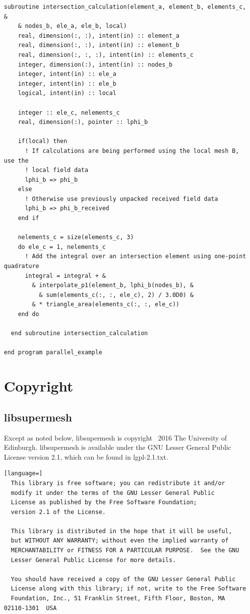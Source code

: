\documentclass{article}
\begin{document}
\begin{lstlisting}[language=FORTRAN]
  subroutine intersection_calculation(element_a, element_b, elements_c, &
    & nodes_b, ele_a, ele_b, local)
    real, dimension(:, :), intent(in) :: element_a
    real, dimension(:, :), intent(in) :: element_b
    real, dimension(:, :, :), intent(in) :: elements_c
    integer, dimension(:), intent(in) :: nodes_b
    integer, intent(in) :: ele_a
    integer, intent(in) :: ele_b
    logical, intent(in) :: local

    integer :: ele_c, nelements_c
    real, dimension(:), pointer :: lphi_b
    
    if(local) then
      ! If calculations are being performed using the local mesh B, use the
      ! local field data
      lphi_b => phi_b
    else
      ! Otherwise use previously unpacked received field data
      lphi_b => phi_b_received
    end if

    nelements_c = size(elements_c, 3)
    do ele_c = 1, nelements_c
      ! Add the integral over an intersection element using one-point quadrature
      integral = integral + &
        & interpolate_p1(element_b, lphi_b(nodes_b), &
          & sum(elements_c(:, :, ele_c), 2) / 3.0D0) &
        & * triangle_area(elements_c(:, :, ele_c))
    end do    
    
  end subroutine intersection_calculation
  
end program parallel_example
\end{lstlisting}

\section{Copyright}\label{sect:copyright}

\subsection{libsupermesh}

Except as noted below, libsupermesh is copyright \textcopyright\ 2016 The
University of Edinburgh. libsupermesh is available under the GNU Lesser General
Public License version 2.1, which can be found in lgpl-2.1.txt.

\begin{lstlisting}[language=]
  This library is free software; you can redistribute it and/or
  modify it under the terms of the GNU Lesser General Public
  License as published by the Free Software Foundation;
  version 2.1 of the License.

  This library is distributed in the hope that it will be useful,
  but WITHOUT ANY WARRANTY; without even the implied warranty of
  MERCHANTABILITY or FITNESS FOR A PARTICULAR PURPOSE.  See the GNU
  Lesser General Public License for more details.

  You should have received a copy of the GNU Lesser General Public
  License along with this library; if not, write to the Free Software
  Foundation, Inc., 51 Franklin Street, Fifth Floor, Boston, MA  02110-1301  USA
\end{lstlisting}
\end{document}
